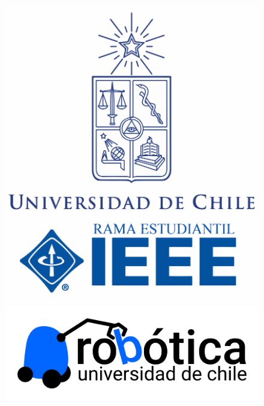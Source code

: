 \begin{titlepage}
  \begin{figure}[h!]
    \centering
    \begin{minipage}{.24\textwidth}
      \centering
      \includegraphics[width=\linewidth]{./images/logos/ieee.png}
    \end{minipage}%
    \begin{minipage}{.24\textwidth}
      \centering
      \includegraphics[width=\linewidth]{./images/logos/comrob.png}
    \end{minipage}
    \begin{minipage}{.24\textwidth}
      \centering

\end{minipage}
\end{figure}
\end{titlepage}

